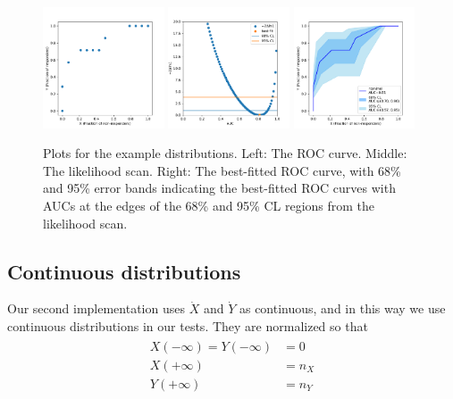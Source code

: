\documentclass[11pt]{article}
\newcommand{\Xdot}{\dot{X}}
\newcommand{\Ydot}{\dot{Y}}
\begin{document}
\begin{figure}
	\begin{center}
		\includegraphics[width=0.32\textwidth]{discrete_exampleroc.pdf}
		\includegraphics[width=0.32\textwidth]{discrete_scan.pdf}
		\includegraphics[width=0.32\textwidth]{discrete_exampleroc_errors.pdf}
		\caption{Plots for the example distributions. Left: The ROC curve. Middle: The likelihood scan. Right: The best-fitted ROC curve, with 68\% and 95\% error bands indicating the best-fitted ROC curves with AUCs at the edges of the 68\% and 95\% CL regions from the likelihood scan.}
		\label{fig:exampledata_discrete}
	\end{center}
\end{figure}

\subsection{Continuous distributions}
\label{sec:lagrangian}

Our second implementation uses \(\Xdot\) and \(\Ydot\) as continuous, and in this way we use continuous distributions in our tests.  They are normalized so that
\begin{align}
\begin{aligned}
X(-\infty)=Y(-\infty)&=0 \\
X(+\infty)&=n_X \\
Y(+\infty)&=n_Y
\end{aligned}
\end{align}
\end{document}
